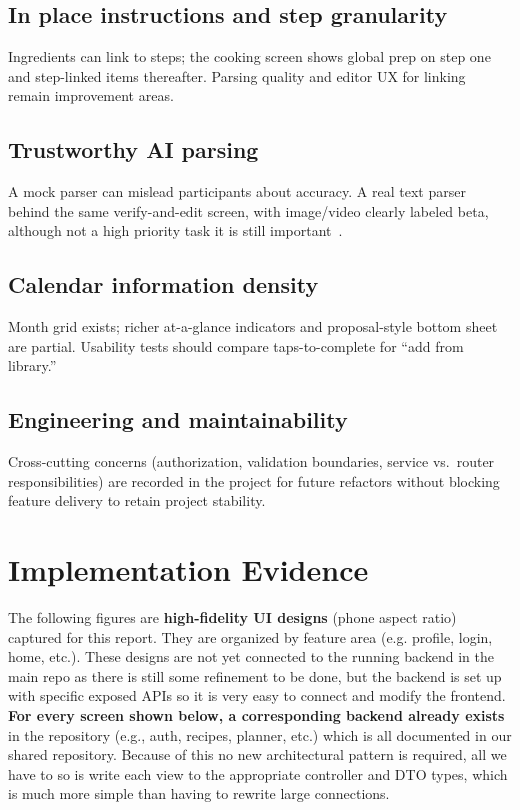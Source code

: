 \documentclass[conference]{IEEEtran}
\begin{document}
\subsection{In place instructions and step granularity}
Ingredients can link to steps; the cooking screen shows global prep on step one and step-linked items thereafter. Parsing quality and editor UX for linking remain improvement areas.

\subsection{Trustworthy AI parsing}
A mock parser can mislead participants about accuracy. A real text parser behind the same verify-and-edit screen, with image/video clearly labeled beta, although not a high priority task it is still important~\cite{nielsen1994heuristic}.

\subsection{Calendar information density}
Month grid exists; richer at-a-glance indicators and proposal-style bottom sheet are partial. Usability tests should compare taps-to-complete for ``add from library.''

\subsection{Engineering and maintainability}
Cross-cutting concerns (authorization, validation boundaries, service vs.\ router responsibilities) are recorded in the project for future refactors without blocking feature delivery to retain project stability.

\section{Implementation Evidence}
\label{sec:evidence}

The following figures are \textbf{high-fidelity UI designs} (phone aspect ratio) captured for this report. They are organized by feature area (e.g. profile, login, home, etc.). These designs are not yet connected to the running backend in the main repo as there is still some refinement to be done, but the backend is set up with specific exposed APIs so it is very easy to connect and modify the frontend. \textbf{For every screen shown below, a corresponding backend already exists} in the repository (e.g., auth, recipes, planner, etc.) which is all documented in our shared repository. Because of this no new architectural pattern is required, all we have to so is write each view to the appropriate controller and DTO types, which is much more simple than having to rewrite large connections.
\end{document}
